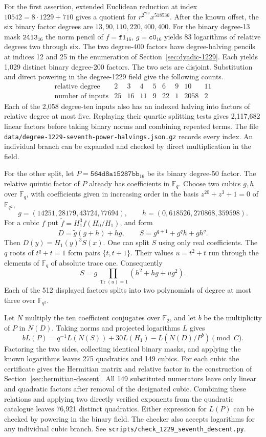 \documentclass[11pt]{article}
\newcommand{\F}{\mathbb F_2}
\begin{document}
For the first assertion, extended Euclidean reduction at index
\(10542=8\cdot1229+710\) gives a quotient for
\(r^{2^{710}} x^{518536}\). After the known offset, the six binary
factor degrees are \(13,90,110,220,400,400\). For the binary
degree-13 mask \(\mathtt{2413}_{16}\) the norm pencil of
\(f=\mathtt{f1}_{16}\), \(g=\mathtt{c0}_{16}\) yields 83 logarithms
of relative degrees two through six. The two degree-400 factors have
degree-halving pencils at indices 12 and 25 in the enumeration of
Section~\ref{sec:dyadic-1229}. Each yields 1,029 distinct binary
degree-200 factors. The two sets are disjoint. Substitution and direct
powering in the degree-1229 field give the following counts.
\[
\begin{array}{c|rrrrrrrr}
\text{relative degree}&2&3&4&5&6&9&10&11\\\hline
\text{number of inputs}&25&16&11&9&22&1&2058&2
\end{array}
\]
Each of the 2,058 degree-ten inputs also has an indexed halving into
factors of relative degree at most five. Replaying their quartic
splitting tests gives 2,117,682 linear factors before taking binary
norms and combining repeated terms. The file
\nolinkurl{data/degree-1229-seventh-power-halvings.json.gz} records
every index. An individual branch can be expanded and checked by
direct multiplication in the field.

For the other split, let \(P=\mathtt{564d8a15287bb}_{16}\) be its
binary degree-50 factor. The relative quintic factor of \(P\) already
has coefficients in \(\mathbb F_q\). Choose two cubics \(g,h\) over
\(\mathbb F_q\), with coefficients given in increasing order in
the basis \(z^{20}+z^3+1=0\) of \(\mathbb F_{q^2}\),
\[
 g=(14251,28179,43724,77694),\qquad h=(0,618526,270868,359598).
\]
For a cubic \(f\) put \(\widetilde f=H_1^3 f(H_0/H_1)\), and form
\[
  D=\widetilde g(g+h)+\widetilde h g,\qquad
  S=g^{q+1}+g^q h+g h^q .
\]
Then \(D(y)=H_1(y)^3 S(x)\). One can split \(S\) using only real
coefficients. The \(q\) roots of \(t^q+t=1\) form pairs
\(\{t,t+1\}\). Their values \(u=t^2+t\) run through the elements
of \(\mathbb F_q\) of absolute trace one. Consequently
\[
  S=g\prod_{\operatorname{Tr}(u)=1}(h^2+hg+ug^2).
\]
Each of the 512 displayed factors splits into two polynomials of
degree at most three over \(\mathbb F_{q^2}\).

Let \(N\) multiply the ten coefficient conjugates over \(\F\), and
let \(b\) be the multiplicity of \(P\) in \(N(D)\). Taking norms
and projected logarithms \(L\) gives
\[
  bL(P)=q^{-1} L(N(S))+30 L(H_1)-L(N(D)/P^b)\pmod C .
\]
Factoring the two sides, collecting identical binary masks, and
applying the known logarithms leaves 275 quadratics and 149 cubics.
For each cubic the certificate gives the Hermitian matrix and
relative factor in the construction of Section~\ref{sec:hermitian-descent}.
All 149 substituted numerators leave only linear and quadratic factors
after removal of the designated cubic. Combining these relations
and applying two directly verified exponents from the quadratic
catalogue leaves 76,921 distinct quadratics. Either expression for
\(L(P)\) can be checked by powering in the binary field. The checker
also accepts logarithms for any individual cubic branch.
See \nolinkurl{scripts/check_1229_seventh_descent.py}.
\end{document}
